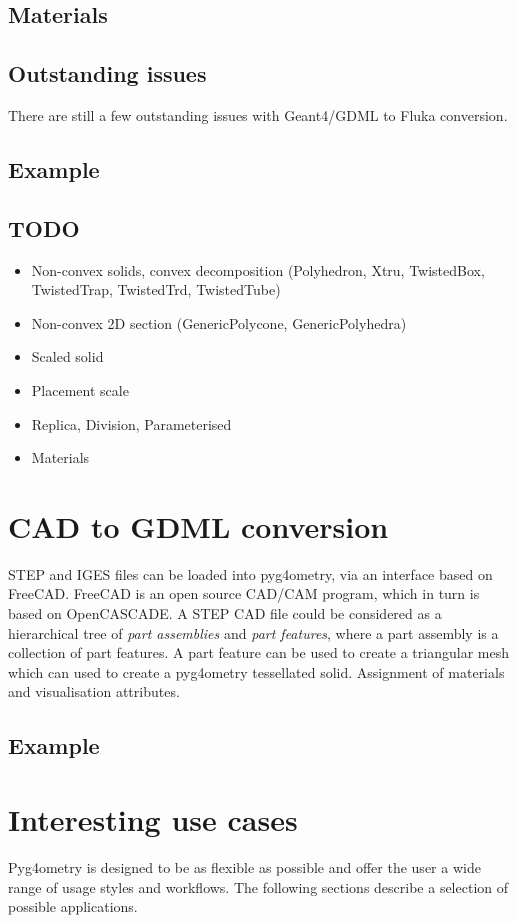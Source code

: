 \documentclass[final,5p,times,twocolumn]{elsarticle}
\begin{document}
\subsection{Materials}

\subsection{Outstanding issues}
There are still a few outstanding issues with Geant4/GDML to Fluka conversion. 

\subsection{Example}

\subsection{TODO}
\begin{itemize}
\item Non-convex solids, convex decomposition (Polyhedron, Xtru, TwistedBox, TwistedTrap, TwistedTrd, TwistedTube)
\item Non-convex 2D section (GenericPolycone, GenericPolyhedra)
\item Scaled solid 
\item Placement scale 
\item Replica, Division, Parameterised
\item Materials 
\end{itemize}

\section{CAD to GDML conversion }
STEP and IGES files can be loaded into pyg4ometry, via an interface based on FreeCAD. FreeCAD is an open source CAD/CAM program, which in turn 
is based on OpenCASCADE. A STEP CAD file could be considered as a hierarchical tree of {\it part assemblies} and {\it part features}, where a part assembly is a 
collection of part features. A part feature can be used to create  a triangular mesh which can used to create a pyg4ometry tessellated solid. Assignment of materials 
and visualisation attributes. 

\subsection{Example}

\section{Interesting use cases}
Pyg4ometry is designed to be as flexible as possible and offer the user a wide range of usage styles and workflows. The following sections describe a selection of 
possible applications.
\end{document}

